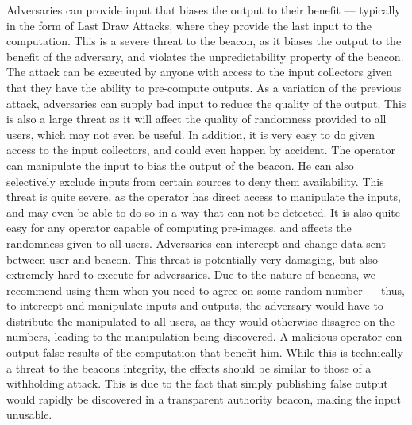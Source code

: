  Adversaries can provide input that biases the output to their benefit --- typically in the form of Last Draw Attacks, where they provide the last input to the computation. This is a severe threat to the beacon, as it biases the output to the benefit of the adversary, and violates the unpredictability property of the beacon. The attack can be executed by anyone with access to the input collectors given that they have the ability to pre-compute outputs.
 As a variation of the previous attack, adversaries can supply bad input to reduce the quality of the output. This is also a large threat as it will affect the quality of randomness provided to all users, which may not even be useful. In addition, it is very easy to do given access to the input collectors, and could even happen by accident.
 The operator can manipulate the input to bias the output of the beacon. He can also selectively exclude inputs from certain sources to deny them availability. This threat is quite severe, as the operator has direct access to manipulate the inputs, and may even be able to do so in a way that can not be detected. It is also quite easy for any operator capable of computing pre-images, and affects the randomness given to all users.
 Adversaries can intercept and change data sent between user and beacon. This threat is potentially very damaging, but also extremely hard to execute for adversaries. Due to the nature of beacons, we recommend using them when you need to agree on some random number --- thus, to intercept and manipulate inputs and outputs, the adversary would have to distribute the manipulated to all users, as they would otherwise disagree on the numbers, leading to the manipulation being discovered.
 A malicious operator can output false results of the computation that benefit him. While this is technically a threat to the beacons integrity, the effects should be similar to those of a withholding attack. This is due to the fact that simply publishing false output would rapidly be discovered in a transparent authority beacon, making the input unusable.
